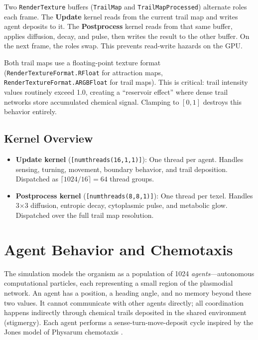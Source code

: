 \documentclass[12pt, titlepage]{article}
\begin{document}
Two \texttt{RenderTexture} buffers (\texttt{TrailMap} and
\texttt{TrailMapProcessed}) alternate roles each frame. The \textbf{Update}
kernel reads from the current trail map and writes agent deposits to it. The
\textbf{Postprocess} kernel reads from that same buffer, applies diffusion,
decay, and pulse, then writes the result to the other buffer. On the next
frame, the roles swap. This prevents read-write hazards on the GPU.

Both trail maps use a floating-point texture format
(\texttt{RenderTextureFormat.RFloat} for attraction maps,
\texttt{RenderTextureFormat.ARGBFloat} for trail maps). This is critical:
trail intensity values routinely exceed 1.0, creating a ``reservoir effect''
where dense trail networks store accumulated chemical signal. Clamping to
$[0, 1]$ destroys this behavior entirely.

\subsection{Kernel Overview}

\begin{itemize}
    \item \textbf{Update kernel} (\texttt{[numthreads(16,1,1)]}): One thread
    per agent. Handles sensing, turning, movement, boundary behavior, and trail
    deposition. Dispatched as $\lceil 1024 / 16 \rceil = 64$ thread groups.

    \item \textbf{Postprocess kernel} (\texttt{[numthreads(8,8,1)]}): One
    thread per texel. Handles 3$\times$3 diffusion, entropic decay,
    cytoplasmic pulse, and metabolic glow. Dispatched over the full trail map resolution.
\end{itemize}

\section{Agent Behavior and Chemotaxis}
\label{sec:agents}

The simulation models the organism as a population of 1024 \textit{agents}---autonomous computational particles, each representing a small region
of the plasmodial network. An agent has a position, a heading angle, and no
memory beyond these two values. It cannot communicate with other agents
directly; all coordination happens indirectly through chemical trails deposited
in the shared environment (stigmergy). Each agent performs a
sense-turn-move-deposit cycle inspired by the Jones model of Physarum
chemotaxis \cite{adamatzky2014}.
\end{document}
